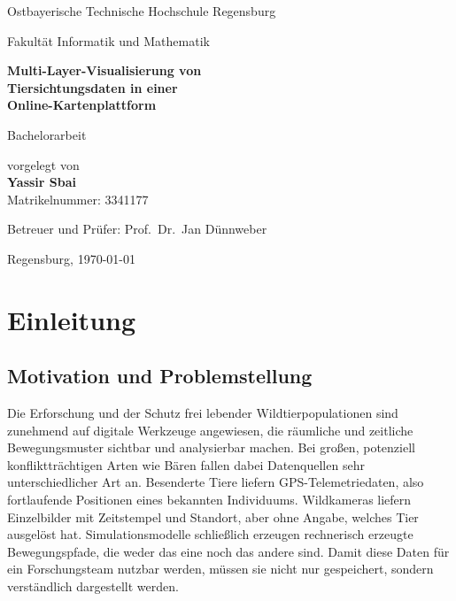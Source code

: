 \documentclass[12pt,a4paper]{scrreprt}
\begin{document}
\begin{titlepage}
\centering
\vspace*{1.5cm}

{\Large Ostbayerische Technische Hochschule Regensburg\par}
{\large Fakultät Informatik und Mathematik\par}

\vspace{3cm}
{\Huge\bfseries Multi-Layer-Visualisierung von\\[0.35em]
Tiersichtungsdaten in einer\\[0.35em]
Online-Kartenplattform\par}

\vspace{2.5cm}
{\Large Bachelorarbeit\par}

\vspace{2.5cm}
{\large
vorgelegt von\\[0.6em]
{\bfseries Yassir Sbai}\\[0.4em]
Matrikelnummer: 3341177\par}

\vspace{2cm}
{\large Betreuer und Prüfer: Prof.\ Dr.\ Jan Dünnweber\par}

\vfill
{\large Regensburg, \today\par}
\end{titlepage}

\tableofcontents

\chapter{Einleitung}
\label{kap:einleitung}

\section{Motivation und Problemstellung}
\label{sec:motivation}

Die Erforschung und der Schutz frei lebender Wildtierpopulationen sind
zunehmend auf digitale Werkzeuge angewiesen, die räumliche und zeitliche
Bewegungsmuster sichtbar und analysierbar machen. Bei großen,
potenziell konfliktträchtigen Arten wie Bären fallen dabei
Datenquellen sehr unterschiedlicher Art an. Besenderte Tiere liefern
GPS-Telemetriedaten, also fortlaufende Positionen eines bekannten
Individuums. Wildkameras liefern Einzelbilder mit Zeitstempel und
Standort, aber ohne Angabe, welches Tier ausgelöst hat.
Simulationsmodelle schließlich erzeugen rechnerisch erzeugte
Bewegungspfade, die weder das eine noch das andere sind. Damit diese
Daten für ein Forschungsteam nutzbar werden, müssen sie nicht nur
gespeichert, sondern verständlich dargestellt werden.
\end{document}
